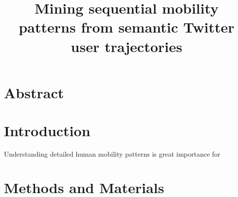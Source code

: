 \documentclass[a4paper,11pt]{article}
\begin{document}
\title{Mining sequential mobility patterns from semantic Twitter user trajectories}
\maketitle

\section*{Abstract}

\section*{Introduction}
Understanding detailed human mobility patterns is great importance for 


\section*{Methods and Materials}
\end{document}
